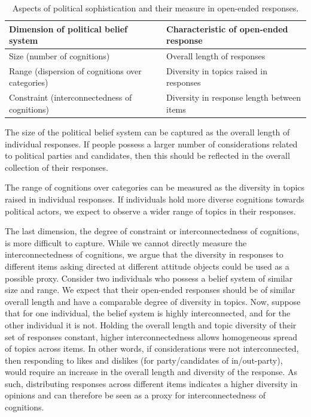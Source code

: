 \documentclass[12pt]{article}
\begin{document}
\begin{table}[h]
\begin{tabular}{ll}
\hline 
Dimension of political belief system & Characteristic of open-ended response \\
\hline
Size (number of cognitions) & Overall length of responses \\
Range (dispersion of cognitions over categories) & Diversity in topics raised in responses \\
Constraint (interconnectedness of cognitions) & Diversity in response length between items \\
\hline
\end{tabular}
\caption{Aspects of political sophistication and their measure in open-ended responses.}\label{tab:measure}
\end{table}

The size of the political belief system can be captured as the overall length of individual responses. If people possess a larger number of considerations related to political parties and candidates, then this should be reflected in the  overall collection of their responses.

The range of cognitions over categories can be measured as the diversity in topics raised in individual responses. If individuals hold more diverse cognitions towards political actors, we expect to observe a wider range of topics in their responses.

The last dimension, the degree of constraint or interconnectedness of cognitions, is more difficult to capture. While we cannot directly measure the interconnectedness of cognitions, we argue that the diversity in responses to different items asking directed at different attitude objects could be used as a possible proxy. Consider two individuals who possess a belief system of similar size and range. We expect that their open-ended responses should be of similar overall length and have a comparable degree of diversity in topics. Now, suppose that for one individual, the belief system is highly interconnected, and for the other individual it is not. Holding the overall length and topic diversity of their set of responses constant, higher interconnectedness allows homogeneous spread of topics across items. In other words, if considerations were not interconnected, then responding to likes and dislikes (for party/candidates of in/out-party), would require an increase in the overall length and diversity of the response. As such, distributing responses across different items indicates a higher diversity in opinions and can therefore be seen as a proxy for interconnectedness of cognitions.
\end{document}

